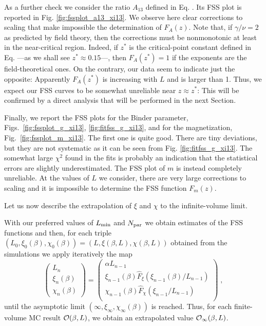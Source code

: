 \documentclass[12pt]{article}
\newcommand{\text}{\rm}
\begin{document}
As a further check we consider the ratio $A_{13}$ defined in Eq.
. Its FSS plot is reported in
Fig. \ref{fig:fssplot_a13_xi13}. We observe here clear corrections to 
scaling that make impossible the determination of $F_A(z)$.
Note that, if $\gamma/\nu =2$ as predicted by field theory, 
then the corrections must be nonmonotonic at least in the 
near-critical region. Indeed,
if $z^*$ is the critical-point constant defined in
Eq. ---as we shall see $z^*\approx 0.15$---,
then $F_A(z^*) = 1$ if the exponents are the
field-theoretical ones.  On the contrary, our data seem to indicate
just the opposite: Apparently $F_A(z^*)$ is increasing with $L$ and
is larger than 1. 
Thus, we expect our FSS curves to be somewhat unreliable near 
$z\approx z^*$: This will be confirmed by a direct analysis that will
be performed in the next Section.

Finally, we report the FSS plots for the Binder parameter, 
Figs.~\ref{fig:fssplot_g_xi13}, \ref{fig:fitfss_g_xi13}, 
and for the magnetization,  
Fig.~\ref{fig:fssplot_m_xi13}.  The first one is quite good. There are 
tiny deviations, but they are not systematic as it can be seen 
from Fig. \ref{fig:fitfss_g_xi13}. The somewhat large $\chi^2$ found in the 
fits is probably an indication that the statistical errors are 
slightly underestimated. The FSS plot of $m$ is instead completely
unreliable. At the values of $L$ we consider, there are 
very large corrections to scaling and it is impossible to determine 
the FSS function $F_m(z)$. 

Let us now describe the extrapolation of $\xi$ and $\chi$ to the 
infinite-volume limit. 

With our preferred values of $L_{\text{min}}$ and
$N_{\text{par}}$ we obtain estimates of the FSS functions and then, 
for each triple $(L_{0},\xi_{0}(\beta),\chi_{0}(\beta)) =
(L,\xi(\beta,L),\chi(\beta,L))$ obtained from the simulations
we apply iteratively the map
\begin{equation}
\left(\begin{array}{c} 
 L_{n} \\ \xi_{n}(\beta) \\ \chi_{n}(\beta) 
\end{array}\right)
=
\left(
\begin{array}{c}
\alpha L_{n-1}\\\xi_{n-1}(\beta) \hat F_\xi(\xi_{n-1}(\beta)/L_{n-1})\\
\chi_{n-1}(\beta) \hat F_\chi(\xi_{n-1}/L_{n-1})\\ 
\end{array} \right) \; ,
\end{equation}
until the asymptotic limit $(\infty, \xi_\infty,\chi_\infty(\beta))$ is
reached. Thus, for each finite-volume MC result ${\cal O}(\beta,L)$, 
we obtain an extrapolated value ${\cal O}_\infty(\beta,L)$.
\end{document}
